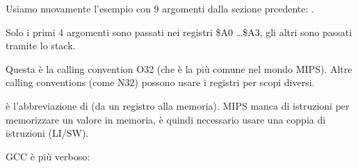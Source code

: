 Usiamo nuovamente l'esempio con 9 argomenti dalla sezione prcedente: .




Solo i primi 4 argomenti sono passati nei registri \$A0 \dots \$A3, gli altri sono passati tramite lo stack.

Questa è la calling convention O32 (che è la più comune nel mondo MIPS).
Altre calling conventions (come N32) possono usare i registri per scopi diversi.


 è l'abbreviazione di  (da un registro alla memoria).
MIPS manca di istruzioni per memorizzare un valore in memoria, è quindi necessario usare una coppia di istruzioni (LI/SW).






\NonOptimizing GCC è più verboso:




